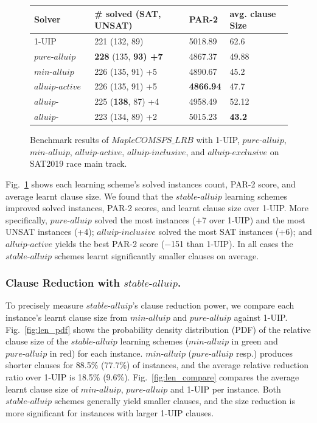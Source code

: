 \documentclass[runningheads]{llncs}
\newcommand{\oneuip}{1-UIP\xspace}
\newcommand{\stablealluip}{\textit{stable-alluip}\xspace}
\newcommand{\allUipPure}{\textit{pure-alluip}\xspace}
\newcommand{\allUipMin}{\textit{min-alluip}\xspace}
\newcommand{\allUipAct}{\textit{alluip-active}}
\newcommand{\allUipIn}{\textit{alluip-inclusive}}
\newcommand{\allUipEx}{\textit{alluip-exclusive}}
\newcommand{\MapleBase}{\textit{MapleCOMSPS\_LRB}}
\begin{document}
\begin{figure} 
\begin{center}
\begin{tabular}{ | m{3.2cm} | m{3.8cm}| m{2cm} | m{2.75cm} |  } 
\hline
Solver & \# solved (SAT, UNSAT) & PAR-2 & avg. clause Size \\ 
\hline
\oneuip & 221 (132, 89)  & 5018.89 & 62.6  \\ 
\hline
$\allUipPure$ &\textbf{228} (135, \bf{93}) +7 & 4867.37 & 49.88 \\
\hline
$\allUipMin$ & 226 (135, 91) +5 & 4890.67 & 45.2 \\ 
\hline
$\allUipAct$ & 226 (135, 91)  +5 & \textbf{4866.94} & 47.7 \\
\hline
$\allUipIn$ & 225 (\textbf{138}, 87) +4 & 4958.49 & 52.12 \\
\hline
$\allUipEx$ & 223 (134, 89) +2& 5015.23& \textbf{43.2} \\
\hline
\end{tabular}
\end{center}
\caption{Benchmark results of $\MapleBase$ with \oneuip, $\allUipPure$, $\allUipMin$, $\allUipAct$,
$\allUipIn$, and $\allUipEx$ on SAT2019 race main track.}
\label{fig:t4}
\end{figure}


Fig.~\ref{fig:t4} shows each learning scheme's solved instances count,
PAR-2 score, and average learnt clause size. We found that the
$\stablealluip$ learning schemes improved solved instances, PAR-2 scores,
and learnt clause size over \oneuip. More specifically, $\allUipPure$
solved the most instances (+7 over \oneuip) and the most UNSAT instances
(+4); $\allUipIn$ solved the most SAT instances (+6); and $\allUipAct$
yields the best PAR-2 score ($-$151 than \oneuip). In all cases the
$\stablealluip$ schemes learnt significantly smaller clauses on average.

\subsubsection{Clause Reduction with $\stablealluip$.}
To precisely measure $\stablealluip$'s clause reduction power, we compare
each instance's learnt clause size from $\allUipMin$ and $\allUipPure$
against \oneuip. Fig.~\ref{fig:len_pdf} shows the probability density
distribution (PDF) of the relative clause size of the $\stablealluip$
learning schemes ($\allUipMin$ in green and $\allUipPure$ in red) for
each instance. $\allUipMin$ ($\allUipPure$ resp.) produces shorter
clauses for 88.5\% (77.7\%) of instances, and the average relative
reduction ratio over \oneuip is 18.5\%
(9.6\%). Fig.~\ref{fig:len_compare} compares the average learnt
clause size of $\allUipMin$, $\allUipPure$ and \oneuip per instance.
Both $\stablealluip$ schemes generally yield smaller clauses, and the size
reduction is more significant for instances with larger \oneuip clauses.
\end{document}
